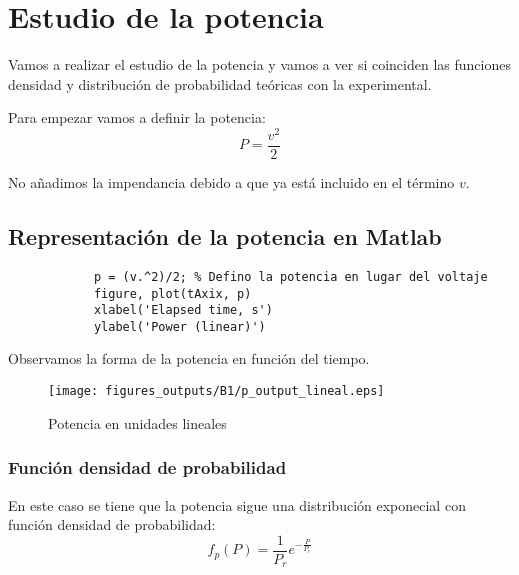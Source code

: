 \documentclass{article}
\begin{document}
\section{Estudio de la potencia}
    \par Vamos a realizar el estudio de la potencia y vamos a ver si coinciden las funciones densidad y distribución de probabilidad teóricas con la experimental.
    \par Para empezar vamos a definir la potencia:
    \begin{equation}
        \tag{Variable aleatoria de la potencia}
        P = \frac{v^2}{2}
    \end{equation}
    \par No añadimos la impendancia debido a que ya está incluido en el término \(v\).
    \subsection{Representación de la potencia en Matlab}
        \begin{lstlisting}
            p = (v.^2)/2; % Defino la potencia en lugar del voltaje
            figure, plot(tAxix, p)
            xlabel('Elapsed time, s')
            ylabel('Power (linear)')
        \end{lstlisting}
        \par Observamos la forma de la potencia en función del tiempo.
        \begin{figure}[h]
            \centering
            \texttt{[image: figures\_outputs/B1/p\_output\_lineal.eps]}
            \caption{Potencia en unidades lineales}
            \label{fig:pot_unidades_lineal}
        \end{figure}
        \subsubsection{Función densidad de probabilidad}
            \par En este caso se tiene que la potencia sigue una distribución exponecial con función densidad de probabilidad:
            \begin{equation}
                \tag{Función densidad de probabilidad de la potencia}
                f_p (P) = \frac{1}{P_r}e^{-\frac{P}{P_r}}
            \end{equation}
\end{document}

